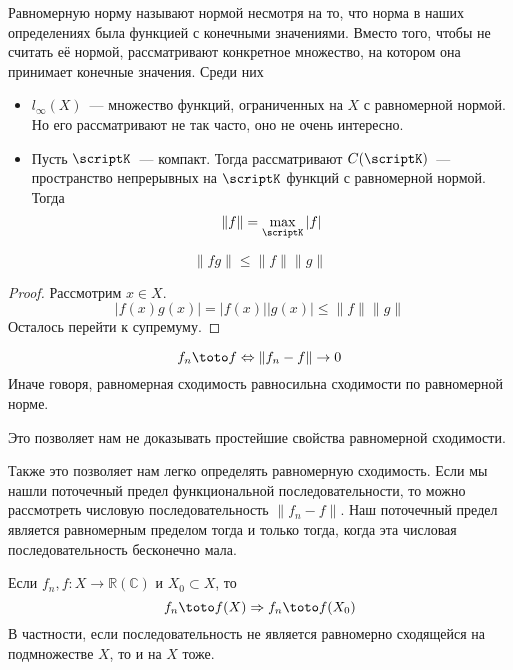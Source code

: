 \documentclass{article}
\begin{document}
    \begin{remark}
        Равномерную норму называют нормой несмотря на то, что норма в наших определениях была функцией с конечными значениями. Вместо того, чтобы не считать её нормой, рассматривают конкретное множество, на котором она принимает конечные значения. Среди них
        \begin{itemize}
            \item $l_\infty(X)$~--- множество функций, ограниченных на $X$ с равномерной нормой. Но его рассматривают не так часто, оно не очень интересно.
            \item Пусть $\scriptK$~--- компакт. Тогда рассматривают $C(\scriptK)$~--- пространство непрерывных на $\scriptK$ функций с равномерной нормой. Тогда
            $$\|f\|=\max\limits_\scriptK|f|$$
        \end{itemize}
    \end{remark}
    \begin{claim}
        $$\|fg\|\leqslant\|f\|\|g\|$$
    \end{claim}
    \begin{proof}
        Рассмотрим $x\in X$.
        $$|f(x)g(x)|=|f(x)||g(x)|\leqslant\|f\|\|g\|$$
        Осталось перейти к супремуму.
    \end{proof}
    \begin{claim}
        $$f_n\toto f\Leftrightarrow\|f_n-f\|\rightarrow0$$
        Иначе говоря, равномерная сходимость равносильна сходимости по равномерной норме.
    \end{claim}
    \begin{remark}
        Это позволяет нам не доказывать простейшие свойства равномерной сходимости.
    \end{remark}
    \begin{remark}
        Также это позволяет нам легко определять равномерную сходимость. Если мы нашли поточечный предел функциональной последовательности, то можно рассмотреть числовую последовательность $\|f_n-f\|$. Наш поточечный предел является равномерным пределом тогда и только тогда, когда эта числовая последовательность бесконечно мала.
    \end{remark}
    \begin{remark}
        Если $f_n,f\colon X\to\mathbb R(\mathbb C)$ и $X_0\subset X$, то
        $$
        f_n\toto f(X)\Rightarrow f_n\toto f(X_0)
        $$
        В частности, если последовательность не является равномерно сходящейся на подмножестве $X$, то и на $X$ тоже.
    \end{remark}
\end{document}
